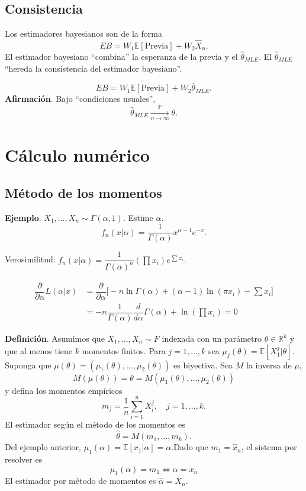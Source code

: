 \documentclass[
  12pt,
]{book}
\begin{document}
\hypertarget{consistencia-1}{%
\subsection{Consistencia}\label{consistencia-1}}

Los estimadores bayesianos son de la forma
\[EB = W_1\mathbb{E}[\text{Previa}] + W_2\hat X_n.\]
El estimador bayesiano ``combina'' la esperanza de la previa y el \(\hat\theta_{MLE}\). El \(\hat\theta_{MLE}\) ``hereda la consistencia del estimador bayesiano''.

\[EB = W_1\mathbb{E}[\text{Previa}] + W_2 \hat\theta_{MLE}.\]
\textbf{Afirmación}. Bajo ``condiciones usuales'',
\[\hat\theta_{MLE} \xrightarrow[n\to \infty]{\mathbb P}\theta.\]

\hypertarget{cuxe1lculo-numuxe9rico}{%
\section{Cálculo numérico}\label{cuxe1lculo-numuxe9rico}}

\hypertarget{muxe9todo-de-los-momentos}{%
\subsection{Método de los momentos}\label{muxe9todo-de-los-momentos}}

\textbf{Ejemplo}. \(X_1,\dots, X_n \sim \Gamma(\alpha,1)\). Estime \(\alpha\).
\[f_n(x|\alpha) = \dfrac{1}{\Gamma(\alpha)}x^{\alpha-1}e^{-x}.\]

Verosimilitud: \(f_n(x|\alpha) = \dfrac 1 {\Gamma(\alpha)^n}(\prod x_i)e^{\sum x_i}\).

\begin{align*}
\dfrac{\partial}{\partial \alpha} L(\alpha|x) & = \dfrac{\partial}{\partial \alpha} \bigg[ -n\ln \Gamma(\alpha) + (\alpha-1)\ln(\pi x_i) - \sum x_i\bigg]\\
& = -n\dfrac{1}{\Gamma(\alpha)} \dfrac d{d\alpha}\Gamma(\alpha) + \ln (\prod x_i) = 0
\end{align*}

\textbf{Definición}. Asumimos que \(X_1,\dots, X_n \sim F\) indexada con un parámetro \(\theta \in \mathbb{R}^k\) y que al menos tiene \(k\) momentos finitos. Para \(j = 1,\dots, k\) sea \(\mu_j(\theta) = \mathbb{E}[X_1^j|\theta]\). Suponga que \(\mu(\theta) = (\mu_1(\theta),\dots,\mu_2(\theta))\) es biyectiva. Sea \(M\) la inversa de \(\mu\),
\[ M(\mu(\theta)) = \theta =M(\mu_1(\theta),\dots,\mu_2(\theta)) \]
y defina los momentos empíricos
\[ m_j = \dfrac 1n \sum_{i=1}^n X_i^j, \quad j=1,\dots, k.\]
El estimador según el método de los momentos es
\[\hat\theta = M(m_1,\dots,m_k).\]
Del ejemplo anterior, \(\mu_1(\alpha) = \mathbb{E}[x_1|\alpha] = \alpha\).Dado que \(m_1 = \hat x_n\), el sistema por resolver es
\[ \mu_1(\alpha) = m_1 \Longleftrightarrow \alpha = \bar x_n\]
El estimador por método de momentos es \(\hat \alpha = \bar X_n\).
\end{document}
